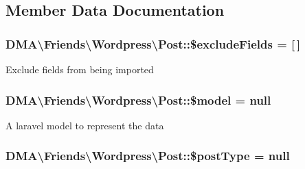 \subsection{Member Data Documentation}
\hypertarget{classDMA_1_1Friends_1_1Wordpress_1_1Post_ac9f76efeb858c94d5ab78e74b4301c16}{
\subsubsection[{\$exclude\-Fields}]{\setlength{\rightskip}{0pt plus 5cm}D\-M\-A\textbackslash{}\-Friends\textbackslash{}\-Wordpress\textbackslash{}\-Post\-::\$exclude\-Fields = \mbox{[}$\,$\mbox{]}\hspace{0.3cm}{\ttfamily [protected]}}}\label{classDMA_1_1Friends_1_1Wordpress_1_1Post_ac9f76efeb858c94d5ab78e74b4301c16}
Exclude fields from being imported \hypertarget{classDMA_1_1Friends_1_1Wordpress_1_1Post_a8a3df2e9db7f90d348d27ea9354176b1}{
\subsubsection[{\$model}]{\setlength{\rightskip}{0pt plus 5cm}D\-M\-A\textbackslash{}\-Friends\textbackslash{}\-Wordpress\textbackslash{}\-Post\-::\$model = null}}\label{classDMA_1_1Friends_1_1Wordpress_1_1Post_a8a3df2e9db7f90d348d27ea9354176b1}
A laravel model to represent the data \hypertarget{classDMA_1_1Friends_1_1Wordpress_1_1Post_a9b0ea251e8ba6b7161fc51ffa8fb72d8}{
\subsubsection[{\$post\-Type}]{\setlength{\rightskip}{0pt plus 5cm}D\-M\-A\textbackslash{}\-Friends\textbackslash{}\-Wordpress\textbackslash{}\-Post\-::\$post\-Type = null}}\label{classDMA_1_1Friends_1_1Wordpress_1_1Post_a9b0ea251e8ba6b7161fc51ffa8fb72d8}
